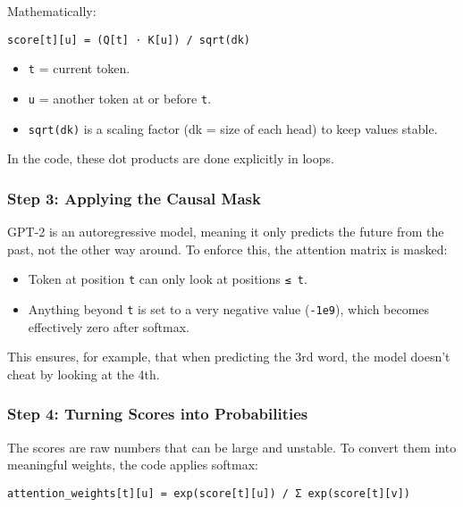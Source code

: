 \documentclass[
  letterpaper,
  DIV=11,
  numbers=noendperiod]{scrreprt}
\providecommand{\tightlist}{%
  \setlength{\itemsep}{0pt}\setlength{\parskip}{0pt}}
\begin{document}
Mathematically:

\begin{verbatim}
score[t][u] = (Q[t] ⋅ K[u]) / sqrt(dk)
\end{verbatim}

\begin{itemize}
\tightlist
\item
  \texttt{t} = current token.
\item
  \texttt{u} = another token at or before \texttt{t}.
\item
  \texttt{sqrt(dk)} is a scaling factor (dk = size of each head) to keep
  values stable.
\end{itemize}

In the code, these dot products are done explicitly in loops.

\subsubsection{Step 3: Applying the Causal
Mask}\label{step-3-applying-the-causal-mask}

GPT-2 is an autoregressive model, meaning it only predicts the future
from the past, not the other way around. To enforce this, the attention
matrix is masked:

\begin{itemize}
\tightlist
\item
  Token at position \texttt{t} can only look at positions \texttt{≤\ t}.
\item
  Anything beyond \texttt{t} is set to a very negative value
  (\texttt{-1e9}), which becomes effectively zero after softmax.
\end{itemize}

This ensures, for example, that when predicting the 3rd word, the model
doesn't cheat by looking at the 4th.

\subsubsection{Step 4: Turning Scores into
Probabilities}\label{step-4-turning-scores-into-probabilities}

The scores are raw numbers that can be large and unstable. To convert
them into meaningful weights, the code applies softmax:

\begin{verbatim}
attention_weights[t][u] = exp(score[t][u]) / Σ exp(score[t][v])
\end{verbatim}
\end{document}
